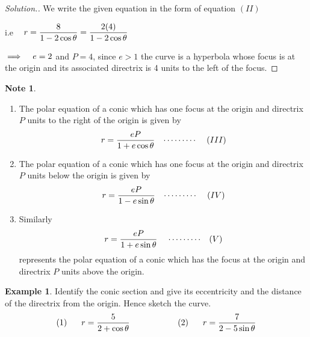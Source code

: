 \documentclass[11pt,a4paper]{article}
\theoremstyle{definition}
\newtheorem{exa}[thm]{Example}
\newtheorem*{note}{Note}
\newenvironment{solution}
  {\renewcommand{\qedsymbol}{}\begin{proof}[\textit{Solution}.]}
  {\end{proof}}
\begin{document}
\begin{solution}


We write the given equation in the form of equation $(II)$


i.e $\hspace{0.3cm} r = \dfrac{8}{1 - 2\cos \theta} = \dfrac{2(4)}{1 - 2\cos \theta}$


$\implies\hspace{0.3cm} e = 2$ and $P = 4$, since $e>1$ the curve is a hyperbola whose focus is at the origin and its associated directrix is 4 units to the left of the focus.
\end{solution}


\begin{note}
\begin{enumerate}
\item The polar equation of a conic which has one focus at the origin and directrix $P$ units to the right of the origin is given by $$r = \dfrac{eP}{1 + e\cos \theta} \hspace{0.3cm}\cdots\cdots\cdots\hspace{0.4cm} (III)$$

\item The polar equation of a conic which has one focus at the origin and directrix $P$ units below the origin is given by $$r = \frac{eP}{ 1 -e\sin \theta}\hspace{0.3cm} \cdots\cdots\cdots\hspace{0.4cm} (IV)$$

\item Similarly $$r = \frac{eP}{1 + e\sin \theta}\hspace{0.4cm}\cdots\cdots\cdots\hspace{0.3cm} (V)$$
represents the polar equation of a conic which has the focus at the origin and directrix $P$ units above the origin.
\end{enumerate}
\end{note}

\begin{exa}


Identify the conic section and give its eccentricity and the distance of the directrix from the origin. Hence sketch the curve.
$$(1)\hspace{0.6cm} r = \dfrac{5}{2 + \cos \theta}\hspace{2cm} (2)\hspace{0.6cm} r = \frac{7}{2 - 5\sin \theta}$$
\end{exa}
\end{document}
